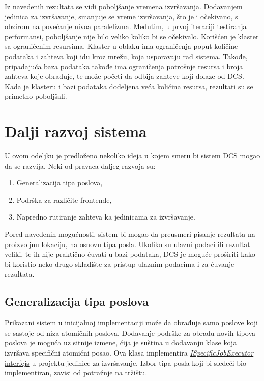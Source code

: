 \documentclass[12pt,oneside]{memoir}
\begin{document}
Iz navedenih rezultata se vidi poboljšanje vremena izvršavanja. Dodavanjem jedinica za izvršavanje, smanjuje se vreme izvršavanja, što je i očekivano, s obzirom na povećanje nivoa paralelizma. Međutim, u prvoj iteraciji testiranja performansi, poboljšanje nije bilo veliko koliko bi se očekivalo. Korišćen je klaster sa ograničenim resursima. Klaster u oblaku ima ograničenja poput količine podataka i zahteva koji idu kroz mrežu, koja usporavaju rad sistema. Takođe, pripadajuća baza podataka takođe ima ograničenja potrošnje resursa i broja zahteva koje obrađuje, te može početi da odbija zahteve koji dolaze od DCS. Kada je klasteru i bazi podataka dodeljena veća količina resursa, rezultati su se primetno poboljšali.

\section{Dalji razvoj sistema}

U ovom odeljku je predloženo nekoliko ideja u kojem smeru bi sistem DCS mogao da se razvija. Neki od pravaca daljeg razvoja su:
\begin{enumerate}
\item Generalizacija tipa poslova,
\item Podrška za različite frontende,
\item Napredno rutiranje zahteva ka jedinicama za izvršavanje.
\end{enumerate}

Pored navedenih mogućnosti, sistem bi mogao da preusmeri pisanje rezultata na proizvoljnu lokaciju, na osnovu tipa posla. Ukoliko su ulazni podaci ili rezultat veliki, te ih nije praktično čuvati u bazi podataka, DCS je moguće proširiti kako bi koristio neko drugo skladište za pristup ulaznim podacima i za čuvanje rezultata.

\subsection{Generalizacija tipa poslova}

Prikazani sistem u inicijalnoj implementaciji može da obrađuje samo poslove koji se sastoje od niza atomičnih poslova. Dodavanje podrške za obradu novih tipova poslova je moguća uz sitnije izmene, čija je suština u dodavanju klase koja izvršava specifični atomični posao. Ova klasa implementira \href{https://github.com/milana-kovacevic/DistributedComputationSystem/blob/main/src/ComputeNode/Executors/ISpecificJobExecutor.cs}{\emph{ISpecificJobExecutor} interfejs} u projektu jedinice za izvršavanje. Izbor tipa posla koji bi sledeći bio implementiran, zavisi od potražnje na tržištu.
\end{document}
